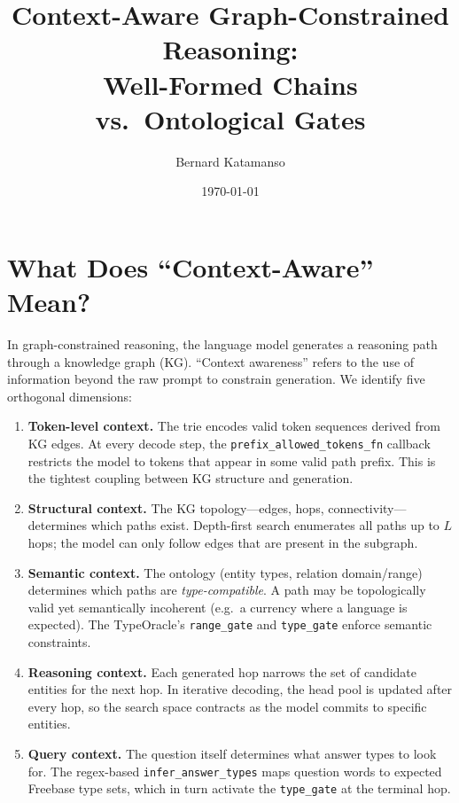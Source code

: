 \documentclass[11pt,a4paper]{article}
\title{Context-Aware Graph-Constrained Reasoning:\\
Well-Formed Chains vs.\ Ontological Gates}
\author{Bernard Katamanso}
\date{\today}
\begin{document}
\maketitle

\section{What Does ``Context-Aware'' Mean?}

In graph-constrained reasoning, the language model generates a reasoning
path through a knowledge graph (KG).  ``Context awareness'' refers to the
use of information beyond the raw prompt to constrain generation.  We
identify five orthogonal dimensions:

\begin{enumerate}[label=\textbf{D\arabic*},leftmargin=2.5em]
  \item \textbf{Token-level context.}
    The trie encodes valid token sequences derived from KG edges.
    At every decode step, the \texttt{prefix\_allowed\_tokens\_fn}
    callback restricts the model to tokens that appear in some valid
    path prefix.  This is the tightest coupling between KG structure and
    generation.

  \item \textbf{Structural context.}
    The KG topology---edges, hops, connectivity---determines which paths
    exist.  Depth-first search enumerates all paths up to $L$ hops;
    the model can only follow edges that are present in the subgraph.

  \item \textbf{Semantic context.}
    The ontology (entity types, relation domain/range) determines which
    paths are \emph{type-compatible}.  A path may be topologically valid
    yet semantically incoherent (e.g.\ a currency where a language is
    expected).  The TypeOracle's \texttt{range\_gate} and
    \texttt{type\_gate} enforce semantic constraints.

  \item \textbf{Reasoning context.}
    Each generated hop narrows the set of candidate entities for the
    next hop.  In iterative decoding, the head pool is updated after
    every hop, so the search space contracts as the model commits to
    specific entities.

  \item \textbf{Query context.}
    The question itself determines what answer types to look for.
    The regex-based \texttt{infer\_answer\_types} maps question words
    to expected Freebase type sets, which in turn activate the
    \texttt{type\_gate} at the terminal hop.
\end{enumerate}
\end{document}
